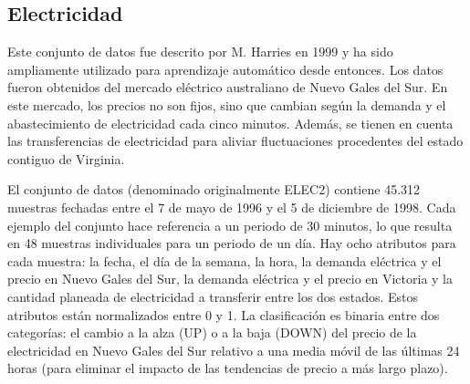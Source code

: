 \subsection{Electricidad}


Este conjunto de datos fue descrito por M. Harries \cite{electricity-dataset} en 1999 y ha sido ampliamente utilizado para aprendizaje automático desde entonces. Los datos fueron obtenidos del mercado eléctrico australiano de Nuevo Gales del Sur. En este mercado, los precios no son fijos, sino que cambian según la demanda y el abastecimiento de electricidad cada cinco minutos. Además, se tienen en cuenta las transferencias de electricidad para aliviar fluctuaciones procedentes del estado contiguo de Virginia.

El conjunto de datos (denominado originalmente ELEC2) contiene 45.312 muestras fechadas entre el 7 de mayo de 1996 y el 5 de diciembre de 1998. Cada ejemplo del conjunto hace referencia a un periodo de 30 minutos, lo que resulta en 48 muestras individuales para un periodo de un día. Hay ocho atributos para cada muestra: la fecha, el día de la semana, la hora, la demanda eléctrica y el precio en Nuevo Gales del Sur, la demanda eléctrica y el precio en Victoria y la cantidad planeada de electricidad a transferir entre los dos estados. Estos atributos están normalizados entre 0 y 1. La clasificación es binaria entre dos categorías: el cambio a la alza (UP) o a la baja (DOWN) del precio de la electricidad en Nuevo Gales del Sur relativo a una media móvil de las últimas 24 horas (para eliminar el impacto de las tendencias de precio a más largo plazo). 

